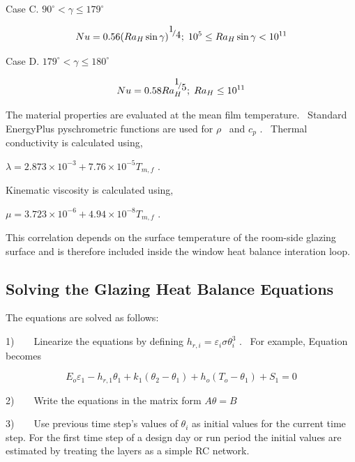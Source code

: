 Case C. \(90^\circ < \gamma \le 179^\circ\)

\begin{equation}
Nu = 0.56{\left( {R{a_H}\sin \gamma } \right)^{{\raise0.7ex\hbox{1} \!\mathord{\left/ {\vphantom {1 4}}\right.}\!\lower0.7ex\hbox{4}}}};\;{10^5} \le R{a_H}\sin \gamma  < {10^{11}}
\end{equation}

Case D. \(179^\circ < \gamma \le 180^\circ\)

\begin{equation}
Nu = 0.58Ra_H^{{\raise0.7ex\hbox{1} \!\mathord{\left/ {\vphantom {1 5}}\right.}\!\lower0.7ex\hbox{5}}};\;R{a_H} \le {10^{11}}
\end{equation}

The material properties are evaluated at the mean film temperature.~ Standard EnergyPlus pyschrometric functions are used for \(\rho\) ~and \({c_p}\) .~ Thermal conductivity is calculated using,

\(\lambda = 2.873 \times {10^{ - 3}} + 7.76 \times {10^{ - 5}}{T_{m,f}}\) .

Kinematic viscosity is calculated using,

\(\mu = 3.723 \times {10^{ - 6}} + 4.94 \times {10^{ - 8}}{T_{m,f}}\) .

This correlation depends on the surface temperature of the room-side glazing surface and is therefore included inside the window heat balance interation loop.

\subsection{Solving the Glazing Heat Balance Equations}\label{solving-the-glazing-heat-balance-equations}

The equations are solved as follows:

1)~~~~Linearize the equations by defining \({h_{r,i}} = {\varepsilon_i}\sigma \theta_i^3\) .~ For example, Equation becomes

\begin{equation}
{E_o}{\varepsilon_1} - {h_{r,1}}{\theta_1} + {k_1}\left( {{\theta_2} - {\theta_1}} \right) + {h_o}\left( {{T_o} - {\theta_1}} \right) + {S_1} = 0
\end{equation}

2)~~~~Write the equations in the matrix form \(A\theta = B\)

3)~~~~Use previous time step's values of \({\theta_i}\) as initial values for the current time step. For the first time step of a design day or run period the initial values are estimated by treating the layers as a simple RC network.

